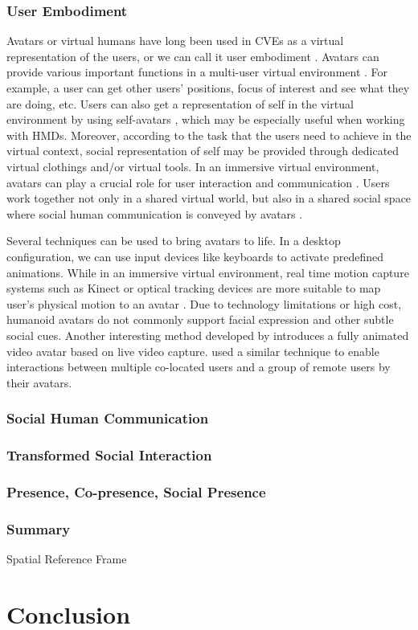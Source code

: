 \subsubsection{User Embodiment}
Avatars or virtual humans have long been used in CVEs as a virtual representation of the users, or we can call it user embodiment \citep{Benford1995UEC}. Avatars can provide various important functions in a multi-user virtual environment \citep{Thalmann2001VHR}. For example, a user can get other users' positions, focus of interest and see what they are doing, etc. Users can also get a representation of self in the virtual environment by using self-avatars \citep{Lok2003Effects}, which may be especially useful when working with HMDs. Moreover, according to the task that the users need to achieve in the virtual context, social representation of self may be provided through dedicated virtual clothings and/or virtual tools. In an immersive virtual environment, avatars can play a crucial role for user interaction and communication \citep{Slater1994Body}. Users work together not only in a shared virtual world, but also in a shared social space where social human communication is conveyed by avatars \citep{Roberts2004SSH}.

Several techniques can be used to bring avatars to life. In a desktop configuration, we can use input devices like keyboards to activate predefined animations. While in an immersive virtual environment, real time motion capture systems such as Kinect or optical tracking devices are more suitable to map user's physical motion to an avatar \citep{Mohler2010Effect, Vera2011AugMir, Normand2012FBA}. Due to technology limitations or high cost, humanoid avatars do not commonly support facial expression and other subtle social cues. Another interesting method developed by \citet{Ogi2001SteAva} introduces a fully animated video avatar based on live video capture. \citet{Beck2013GGT} used a similar technique to enable interactions between multiple co-located users and a group of remote users by their avatars.

\subsubsection{Social Human Communication}

\subsubsection{Transformed Social Interaction}

\subsubsection{Presence, Co-presence, Social Presence}

\subsubsection{Summary}
Spatial Reference Frame

\section{Conclusion}

